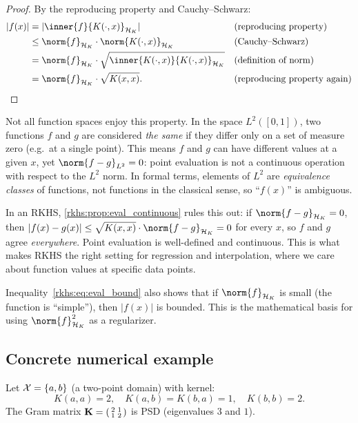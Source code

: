\begin{notechapter}
\begin{proof}
By the reproducing property and Cauchy--Schwarz:
\begin{align*}
|f(x)|
&= |\inner{f}{K(\cdot,x)}_{\hk}|
  && \text{(reproducing property)} \\
&\leq \norm{f}_{\hk} \cdot
  \norm{K(\cdot,x)}_{\hk}
  && \text{(Cauchy--Schwarz)} \\
&= \norm{f}_{\hk} \cdot
  \sqrt{\inner{K(\cdot,x)}{K(\cdot,x)}_{\hk}}
  && \text{(definition of norm)} \\
&= \norm{f}_{\hk} \cdot \sqrt{K(x,x)}.
  && \text{(reproducing property again)}
\end{align*}
\end{proof}

\begin{intuition}
Not all function spaces enjoy this property.
In the space $L^2([0,1])$, two functions $f$ and $g$
are considered \emph{the same} if they differ only on
a set of measure zero (e.g.\ at a single point). This
means $f$ and $g$ can have different values at a given
$x$, yet $\norm{f - g}_{L^2} = 0$: point evaluation
is not a continuous operation with respect to the
$L^2$ norm. In formal terms, elements of $L^2$ are
\emph{equivalence classes} of functions, not functions
in the classical sense, so ``$f(x)$'' is ambiguous.

In an RKHS, \cref{rkhs:prop:eval_continuous}
rules this out: if $\norm{f - g}_{\hk} = 0$, then
$|f(x) - g(x)| \leq \sqrt{K(x,x)}
\cdot \norm{f - g}_{\hk} = 0$ for every $x$, so
$f$ and $g$ agree \emph{everywhere}. Point evaluation
is well-defined and continuous. This is what makes
RKHS the right setting for regression and
interpolation, where we care about function values
at specific data points.

Inequality~\eqref{rkhs:eq:eval_bound} also shows that if
$\norm{f}_{\hk}$ is small (the function is
``simple''), then $|f(x)|$ is bounded. This is the
mathematical basis for using $\norm{f}_{\hk}^2$ as a
regularizer.
\end{intuition}

\subsection{Concrete numerical example}

\begin{example}\label{rkhs:ex:two-point}
Let $\mathcal{X} = \{a, b\}$ (a two-point domain) with kernel:
\[
K(a,a) = 2, \quad K(a,b) = K(b,a) = 1, \quad K(b,b) = 2.
\]
The Gram matrix $\mathbf{K} = \begin{psmallmatrix} 2 & 1 \\ 1 & 2
\end{psmallmatrix}$ is PSD (eigenvalues $3$ and $1$).


\end{example}
\end{notechapter}

